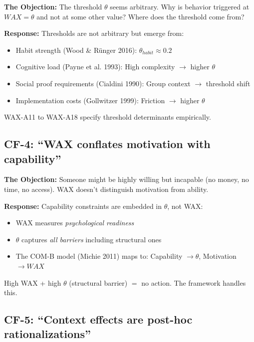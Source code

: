 \textbf{The Objection:} The threshold $\theta$ seems arbitrary. Why is behavior triggered at $WAX = \theta$ and not at some other value? Where does the threshold come from?

\textbf{Response:} Thresholds are not arbitrary but emerge from:
\begin{itemize}[nosep]
    \item Habit strength (Wood \& Rünger 2016): $\theta_{habit} \approx 0.2$
    \item Cognitive load (Payne et al. 1993): High complexity $\to$ higher $\theta$
    \item Social proof requirements (Cialdini 1990): Group context $\to$ threshold shift
    \item Implementation costs (Gollwitzer 1999): Friction $\to$ higher $\theta$
\end{itemize}
WAX-A11 to WAX-A18 specify threshold determinants empirically.

\subsection{CF-4: ``WAX conflates motivation with capability''}

\textbf{The Objection:} Someone might be highly willing but incapable (no money, no time, no access). WAX doesn't distinguish motivation from ability.

\textbf{Response:} Capability constraints are embedded in $\theta$, not WAX:
\begin{itemize}[nosep]
    \item WAX measures \textit{psychological readiness}
    \item $\theta$ captures \textit{all barriers} including structural ones
    \item The COM-B model (Michie 2011) maps to: Capability $\to \theta$, Motivation $\to WAX$
\end{itemize}
High WAX + high $\theta$ (structural barrier) $=$ no action. The framework handles this.

\subsection{CF-5: ``Context effects are post-hoc rationalizations''}

